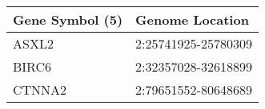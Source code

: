\begin{tabular}{ll}
\toprule
Gene Symbol (5) &     Genome Location \\
\midrule
          ASXL2 & 2:25741925-25780309 \\
          BIRC6 & 2:32357028-32618899 \\
         CTNNA2 & 2:79651552-80648689 \\
\bottomrule
\end{tabular}
